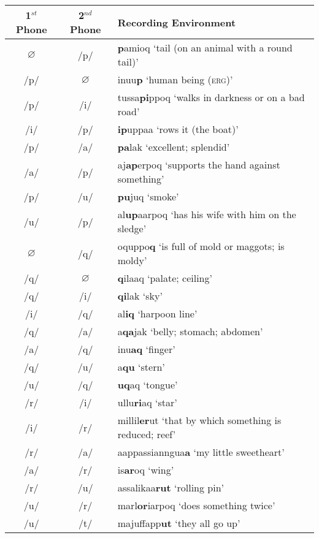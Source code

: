 \documentclass[12pt]{article}
\begin{document}
	\begin{tabular}{|c|c|l|}
	\hline
	1$^{st}$ Phone & 2$^{nd}$ Phone & Recording Environment \\
	\hline
	$\varnothing$ & /p/ & \textbf{p}amioq `tail (on an animal with a round tail)'\\
	/p/ & $\varnothing$ & inuu\textbf{p} `human being (\textsc{erg})'\\
	/p/ & /i/ & tussa\textbf{pi}ppoq `walks in darkness or on a bad road'\\
	/i/ & /p/ & \textbf{ip}uppaa `rows it (the boat)'\\
	/p/ & /a/ & \textbf{pa}lak `excellent; splendid'\\
	/a/ & /p/ & aj\textbf{ap}erpoq `supports the hand against something'\\
	/p/ & /u/ & \textbf{pu}juq `smoke' \\
	/u/ & /p/ & al\textbf{up}aarpoq `has his wife with him on the sledge'\\
	$\varnothing$ & /q/ & oquppo\textbf{q} `is full of mold or maggots; is moldy'\\
	/q/ & $\varnothing$ & \textbf{q}ilaaq `palate; ceiling'\\
	/q/ & /i/ & \textbf{qi}lak `sky' \\
	/i/ & /q/ & al\textbf{iq} `harpoon line' \\
	/q/ & /a/ & a\textbf{qa}jak `belly; stomach; abdomen'\\
	/a/ & /q/ & inu\textbf{aq} `finger' \\
	/q/ & /u/ & a\textbf{qu} `stern'\\
	/u/ & /q/ & \textbf{uq}aq `tongue' \\
	/r/ & /i/ & ullu\textbf{ri}aq `star' \\
	/i/ & /r/ & millil\textbf{er}ut `that by which something is reduced; reef'\\
	/r/ & /a/ & aappassianngua\textbf{a} `my little sweetheart'\\
	/a/ & /r/ & is\textbf{ar}oq `wing'\\
	/r/ & /u/ & assalikaa\textbf{rut} `rolling pin'\\
	/u/ & /r/ & marl\textbf{or}iarpoq `does something twice'\\
	/u/ & /t/ & majuffapp\textbf{ut} `they all go up'\\
	\hline
	\end{tabular}
	\newpage
\end{document}
